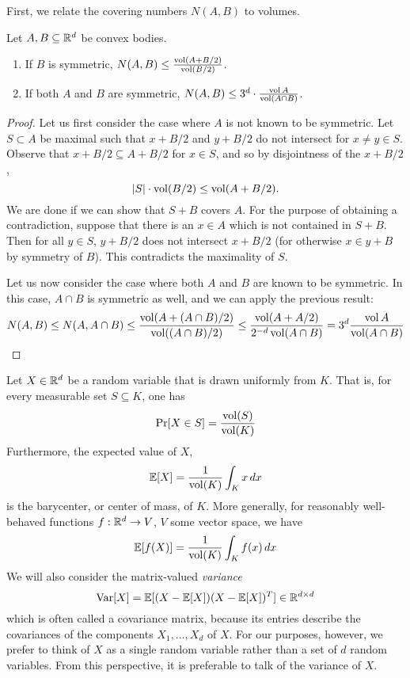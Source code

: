 First, we relate the covering numbers $N(A,B)$ to volumes.

\begin{lemma}
  \label{lemma:N(A,B)-via-volume}
  Let $A, B \subseteq \mathbb{R}^d$ be convex bodies.
  \begin{enumerate}
  \item If $B$ is symmetric, $N(A,B) \leq \frac{\operatorname{vol}(A + B/2)}{\operatorname{vol}(B/2)}$.
  \item If both $A$ and $B$ are symmetric, $N(A,B) \leq 3^d \cdot \frac{\operatorname{vol} A}{\operatorname{vol}(A \cap B)}$.
  \end{enumerate}
\end{lemma}
\begin{proof}
  Let us first consider the case where $A$ is not known to be symmetric.
  Let $S \subset A$ be maximal such that $x + B/2$ and $y + B/2$
  do not intersect for $x \neq y \in S$.
  Observe that $x + B/2 \subseteq A + B/2$ for $x \in S$,
  and so by disjointness of the $x + B/2$,
  \[
    |S| \cdot \operatorname{vol} (B/2) \leq \operatorname{vol}(A + B/2).
  \]
  We are done if we can show that $S + B$ covers $A$.
  For the purpose of obtaining a contradiction,
  suppose that there is an $x \in A$ which is not contained in $S + B$.
  Then for all $y \in S$, $y + B/2$ does not intersect $x + B/2$
  (for otherwise $x \in y + B$ by symmetry of $B$).
  This contradicts the maximality of $S$.

  Let us now consider the case where both $A$ and $B$ are known to be symmetric.
  In this case, $A \cap B$ is symmetric as well,
  and we can apply the previous result:
  \[
    N(A,B) \leq N(A,A\cap B)
      \leq \frac{\operatorname{vol}(A + (A \cap B)/2)}{\operatorname{vol}((A \cap B)/2)}
      \leq \frac{\operatorname{vol}(A + A/2)}{2^{-d} \operatorname{vol}(A \cap B)} = 3^d \frac{\operatorname{vol} A}{\operatorname{vol}(A \cap B)} \qedhere
  \]
\end{proof}

Let $X \in \mathbb{R}^d$ be a random variable that is drawn uniformly from $K$.
That is, for every measurable set $S \subseteq K$, one has
\[
  \Pr[X \in S] = \frac{\operatorname{vol}(S)}{\operatorname{vol}(K)}
\]
Furthermore, the expected value of $X$,
\[
  \mathbb{E}[X] = \frac{1}{\operatorname{vol}(K)} \int_{K} x \,dx
\]
is the barycenter, or center of mass, of $K$.
More generally, for reasonably well-behaved functions $f: \mathbb{R}^d \to V$, $V$ some vector space, we have
\[
  \mathbb{E}[f(X)] = \frac{1}{\operatorname{vol}(K)} \int_{K} f(x) \,dx
\]
We will also consider the matrix-valued \emph{variance}
\[
  \operatorname{Var}[X] = \mathbb{E}[ (X - \mathbb{E}[X])(X - \mathbb{E}[X])^T ] \in \mathbb{R}^{d \times d}
\]
which is often called a covariance matrix,
because its entries describe the covariances of the components $X_1, \ldots, X_d$ of $X$.
For our purposes, however, we prefer to think of $X$ as a single random variable
rather than a set of $d$ random variables.
From this perspective, it is preferable to talk of the variance of $X$.

